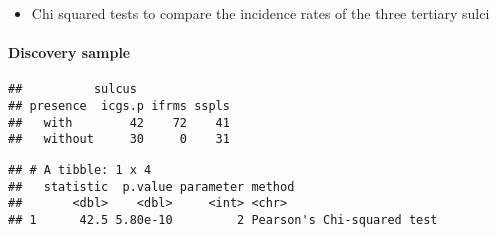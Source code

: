 \documentclass[
]{article}
\newenvironment{Shaded}{\begin{snugshade}}{\end{snugshade}}
\newcommand{\CommentTok}[1]{\textcolor[rgb]{0.56,0.35,0.01}{\textit{#1}}}
\newcommand{\DataTypeTok}[1]{\textcolor[rgb]{0.13,0.29,0.53}{#1}}
\newcommand{\KeywordTok}[1]{\textcolor[rgb]{0.13,0.29,0.53}{\textbf{#1}}}
\newcommand{\NormalTok}[1]{#1}
\newcommand{\OperatorTok}[1]{\textcolor[rgb]{0.81,0.36,0.00}{\textbf{#1}}}
\newcommand{\StringTok}[1]{\textcolor[rgb]{0.31,0.60,0.02}{#1}}
\providecommand{\tightlist}{%
  \setlength{\itemsep}{0pt}\setlength{\parskip}{0pt}}
\begin{document}
\begin{itemize}
\tightlist
\item
  Chi squared tests to compare the incidence rates of the three tertiary
  sulci
\end{itemize}

\hypertarget{discovery-sample}{%
\paragraph{Discovery sample}\label{discovery-sample}}

\begin{Shaded}
\end{Shaded}

\begin{verbatim}
##          sulcus
## presence  icgs.p ifrms sspls
##   with        42    72    41
##   without     30     0    31
\end{verbatim}

\begin{Shaded}
\end{Shaded}

\begin{verbatim}
## # A tibble: 1 x 4
##   statistic  p.value parameter method                    
##       <dbl>    <dbl>     <int> <chr>                     
## 1      42.5 5.80e-10         2 Pearson's Chi-squared test
\end{verbatim}
\end{document}
